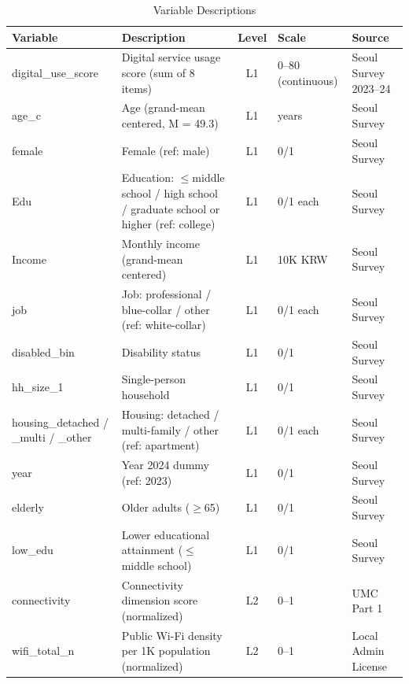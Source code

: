 \begin{table}[htbp]
  \centering\small
  \caption{Variable Descriptions}
  \label{tab:2-hlm-vars}
  \begin{tabularx}{\textwidth}{l Y c l l}
    \toprule
    \textbf{Variable} & \textbf{Description} & \textbf{Level} & \textbf{Scale} & \textbf{Source} \\
    \midrule
    digital\_use\_score & Digital service usage score (sum of 8 items) & L1 & 0--80 (continuous) & Seoul Survey 2023--24 \\
    \addlinespace[2pt]
    age\_c & Age (grand-mean centered, M = 49.3) & L1 & years & Seoul Survey \\
    \addlinespace[2pt]
    female & Female (ref: male) & L1 & 0/1 & Seoul Survey \\
    \addlinespace[2pt]
    Edu & Education: $\leq$middle school / high school / graduate school or higher (ref: college) & L1 & 0/1 each & Seoul Survey \\
    \addlinespace[2pt]
    Income & Monthly income (grand-mean centered) & L1 & 10K KRW & Seoul Survey \\
    \addlinespace[2pt]
    job & Job: professional / blue-collar / other (ref: white-collar) & L1 & 0/1 each & Seoul Survey \\
    \addlinespace[2pt]
    disabled\_bin & Disability status & L1 & 0/1 & Seoul Survey \\
    \addlinespace[2pt]
    hh\_size\_1 & Single-person household & L1 & 0/1 & Seoul Survey \\
    \addlinespace[2pt]
    housing\_detached / \_multi / \_other & Housing: detached / multi-family / other (ref: apartment) & L1 & 0/1 each & Seoul Survey \\
    \addlinespace[2pt]
    year & Year 2024 dummy (ref: 2023) & L1 & 0/1 & Seoul Survey \\
    \addlinespace[2pt]
    elderly & Older adults ($\geq$65) & L1 & 0/1 & Seoul Survey \\
    \addlinespace[2pt]
    low\_edu & Lower educational attainment ($\leq$middle school) & L1 & 0/1 & Seoul Survey \\
    \addlinespace[2pt]
    connectivity & Connectivity dimension score (normalized) & L2 & 0--1 & UMC Part 1 \\
    \addlinespace[2pt]
    wifi\_total\_n & Public Wi-Fi density per 1K population (normalized) & L2 & 0--1 & Local Admin License \\
    \bottomrule
  \end{tabularx}
\end{table}


